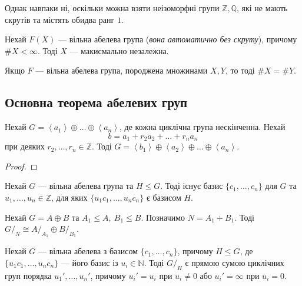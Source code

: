 \documentclass{math_library}
\begin{document}
\begin{example}
Однак навпаки ні, оскільки можна взяти неізоморфні групи $\mathbb{Z}, \mathbb{Q}$, які не мають скрутів та містять обидва ранг $1$.
\end{example}

\begin{remark}
Нехай $F(X)$ --- вільна абелева група (\textit{вона автоматично без скруту}), причому $\# X < \infty$. Тоді $X$ --- макисмально незалежна.
\end{remark}

\begin{corollary}
Якщо $F$ --- вільна абелева група, породжена множинами $X,Y$, то тоді $\# X = \# Y$.
\end{corollary}

\subsection{Основна теорема абелевих груп}
\begin{lemma}
Нехай $G = \left<a_1\right> \oplus \dots \oplus \left<a_n\right>$, де кожна циклічна група нескінченна. Нехай
\[
b = a_1 + r_2 a_2 + \dots + r_n a_n
\]
при деяких $r_2,\dots,r_n \in \mathbb{Z}$. Тоді $G = \left<b_1\right> \oplus \left<a_2\right> \oplus \dots \oplus \left<a_n\right>$.
\end{lemma}

\begin{proof}

\end{proof}

\begin{lemma}
Нехай $G$ --- вільна абелева група та $H \leq G$. Тоді існує базис $\{c_1,\dots,c_n\}$ для $G$ та $u_1,\dots,u_n \in \mathbb{Z}$, для яких $\{u_1c_1,\dots,u_nc_n\}$ є базисом $H$.
\end{lemma}

\begin{lemma}
Нехай $G = A \oplus B$ та $A_1 \leq A,\ B_1 \leq B$. Позначимо $N = A_1 + B_1$. Тоді $G/_N \cong A/_{A_1} \oplus B/_{B_1}$.
\end{lemma}

\begin{corollary}
Нехай $G$ --- вільна абелева з базисом $\{c_1,\dots,c_n\}$, причому $H \leq G$, де $\{u_1c_1,\dots,u_n c_n\}$ --- його базис із $u_i \in \mathbb{N}$. Тоді $G/_H$ є прямою сумою циклічних груп порядка $u_1',\dots,u_n'$, причому $u_i' = u_i$ при $u_i \neq 0$ або $u_i' = \infty$ при $u_i = 0$. 
\end{corollary}
\end{document}
